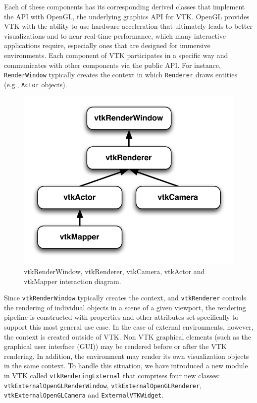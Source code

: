 Each of these components has its corresponding derived classes that implement the API with OpenGL, the underlying graphics API for VTK.
OpenGL provides VTK with the ability to use hardware acceleration that ultimately leads to better visualizations and to near real-time performance, which many interactive applications require, especially ones that are designed for immersive environments.
Each component of VTK participates in a specific way and communicates with other components via the public API.
For instance, \texttt{RenderWindow} typically creates the context in which
\texttt{Renderer} draws entities (e.g., \texttt{Actor} objects).

\begin{figure}[h!]
  \centering
  \includegraphics[width=0.5\linewidth]{images/vtkRenderPipeline.pdf}
  \caption{vtkRenderWindow, vtkRenderer, vtkCamera, vtkActor and vtkMapper interaction diagram.}
  \label{fig:vtkRenderPipeline}
\end{figure}

Since \texttt{vtkRenderWindow} typically creates the context, and \texttt{vtkRenderer} controls the rendering of individual objects in a scene of a given viewport, the rendering pipeline is constructed with properties and other attributes set specifically to support this most general use case.
In the case of external environments, however, the context is created outside of VTK. Non VTK graphical elements (such as the graphical user interface (GUI)) may be rendered before or after the VTK rendering.
In addition, the environment may render its own visualization objects in the same context.
To handle this situation, we have introduced a new module in VTK called \texttt{vtkRenderingExternal} that comprises four new classes: \texttt{vtkExternalOpenGLRenderWindow}, \texttt{vtkExternalOpenGLRenderer}, \texttt{vtkExternalOpenGLCamera} and \texttt{ExternalVTKWidget}. 

